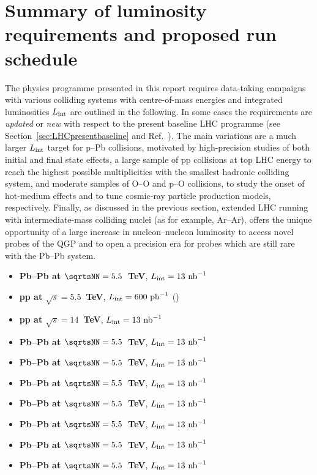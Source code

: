 \documentclass[../report.tex]{subfiles}
\begin{document}
\section{Summary of luminosity requirements and proposed run schedule}
\label{sec:schedule}

The physics programme presented in this report requires data-taking campaigns with various colliding systems with centre-of-mass energies and integrated luminosities $L_{\rm int}$ are outlined in the following. In some cases the requirements are {\it updated} or {\it new} with respect to the present baseline LHC programme (see Section~\ref{sec:LHCpresentbaseline} and Ref.~\cite{Abelevetal:2014cna}). The main variations are a much larger $L_{\rm int}$ target for p--Pb collisions, motivated by high-precision studies of both initial and final state effects, a large sample of pp collisions at top LHC energy to reach the highest possible multiplicities with the smallest hadronic colliding system, and moderate samples of O--O and p--O collisions, to study the onset of hot-medium effects and to tune cosmic-ray particle production models, respectively. Finally, as discussed in the previous section, extended LHC running with intermediate-mass colliding nuclei (as for example, Ar--Ar), offers the unique opportunity of a large increase in nucleon--nucleon luminosity to access novel probes of the QGP and to open a precision era for probes which are still rare with the Pb--Pb system.   

\begin{itemize}
\item {\bf Pb--Pb at $\sqrtsNN=5.5$~TeV}, $L_{\rm int}=13~{\rm nb}^{-1}$
\item {\bf pp at $\sqrt s=5.5$~TeV}, $L_{\rm int}=600~{\rm pb}^{-1}$ ()

\item {\bf pp at $\sqrt s=14$~TeV}, $L_{\rm int}=13~{\rm nb}^{-1}$

\item {\bf Pb--Pb at $\sqrtsNN=5.5$~TeV}, $L_{\rm int}=13~{\rm nb}^{-1}$

\item {\bf Pb--Pb at $\sqrtsNN=5.5$~TeV}, $L_{\rm int}=13~{\rm nb}^{-1}$

\item {\bf Pb--Pb at $\sqrtsNN=5.5$~TeV}, $L_{\rm int}=13~{\rm nb}^{-1}$

\item {\bf Pb--Pb at $\sqrtsNN=5.5$~TeV}, $L_{\rm int}=13~{\rm nb}^{-1}$

\item {\bf Pb--Pb at $\sqrtsNN=5.5$~TeV}, $L_{\rm int}=13~{\rm nb}^{-1}$

\item {\bf Pb--Pb at $\sqrtsNN=5.5$~TeV}, $L_{\rm int}=13~{\rm nb}^{-1}$

\item {\bf Pb--Pb at $\sqrtsNN=5.5$~TeV}, $L_{\rm int}=13~{\rm nb}^{-1}$


\end{itemize}
\end{document}
